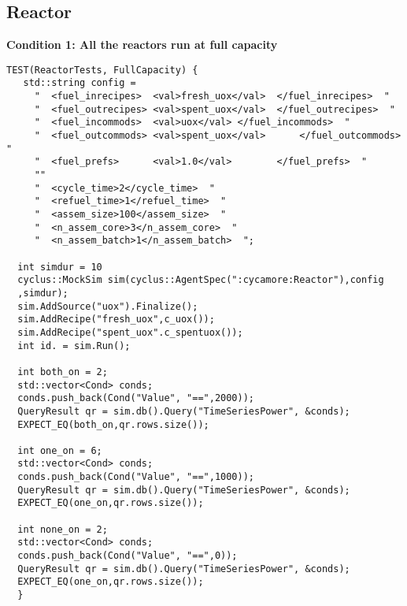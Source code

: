 \documentclass[12pt,letterpaper]{article}
\begin{document}
\subsection{Reactor}
\noindent
\textbf{Condition 1: All the reactors run at full capacity} 
\begin{verbatim}
TEST(ReactorTests, FullCapacity) {
   std::string config = 
     "  <fuel_inrecipes>  <val>fresh_uox</val>  </fuel_inrecipes>  "
     "  <fuel_outrecipes> <val>spent_uox</val>  </fuel_outrecipes>  "
     "  <fuel_incommods>  <val>uox</val> </fuel_incommods>  "
     "  <fuel_outcommods> <val>spent_uox</val>      </fuel_outcommods>  "
     "  <fuel_prefs>      <val>1.0</val>        </fuel_prefs>  "
     ""
     "  <cycle_time>2</cycle_time>  "
     "  <refuel_time>1</refuel_time>  "
     "  <assem_size>100</assem_size>  "
     "  <n_assem_core>3</n_assem_core>  "
     "  <n_assem_batch>1</n_assem_batch>  ";

  int simdur = 10 
  cyclus::MockSim sim(cyclus::AgentSpec(":cycamore:Reactor"),config
  ,simdur); 
  sim.AddSource("uox").Finalize();
  sim.AddRecipe("fresh_uox",c_uox());
  sim.AddRecipe("spent_uox".c_spentuox());
  int id. = sim.Run();

  int both_on = 2; 
  std::vector<Cond> conds; 
  conds.push_back(Cond("Value", "==",2000));
  QueryResult qr = sim.db().Query("TimeSeriesPower", &conds);
  EXPECT_EQ(both_on,qr.rows.size());  
  
  int one_on = 6; 
  std::vector<Cond> conds; 
  conds.push_back(Cond("Value", "==",1000));
  QueryResult qr = sim.db().Query("TimeSeriesPower", &conds);
  EXPECT_EQ(one_on,qr.rows.size());  

  int none_on = 2; 
  std::vector<Cond> conds; 
  conds.push_back(Cond("Value", "==",0));
  QueryResult qr = sim.db().Query("TimeSeriesPower", &conds);
  EXPECT_EQ(one_on,qr.rows.size());  
  }
\end{verbatim}
\end{document}
